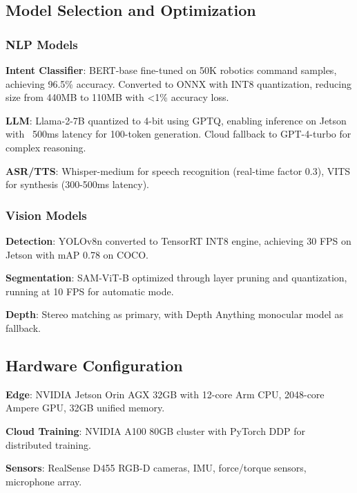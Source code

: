 \documentclass[conference]{IEEEtran}
\begin{document}
\subsection{Model Selection and Optimization}

\subsubsection{NLP Models}

\textbf{Intent Classifier}: BERT-base fine-tuned on 50K robotics command samples, achieving 96.5\% accuracy. Converted to ONNX with INT8 quantization, reducing size from 440MB to 110MB with <1\% accuracy loss.

\textbf{LLM}: Llama-2-7B quantized to 4-bit using GPTQ, enabling inference on Jetson with ~500ms latency for 100-token generation. Cloud fallback to GPT-4-turbo for complex reasoning.

\textbf{ASR/TTS}: Whisper-medium for speech recognition (real-time factor 0.3), VITS for synthesis (300-500ms latency).

\subsubsection{Vision Models}

\textbf{Detection}: YOLOv8n converted to TensorRT INT8 engine, achieving 30 FPS on Jetson with mAP 0.78 on COCO.

\textbf{Segmentation}: SAM-ViT-B optimized through layer pruning and quantization, running at 10 FPS for automatic mode.

\textbf{Depth}: Stereo matching as primary, with Depth Anything monocular model as fallback.

\subsection{Hardware Configuration}

\textbf{Edge}: NVIDIA Jetson Orin AGX 32GB with 12-core Arm CPU, 2048-core Ampere GPU, 32GB unified memory.

\textbf{Cloud Training}: NVIDIA A100 80GB cluster with PyTorch DDP for distributed training.

\textbf{Sensors}: RealSense D455 RGB-D cameras, IMU, force/torque sensors, microphone array.

\end{document}

